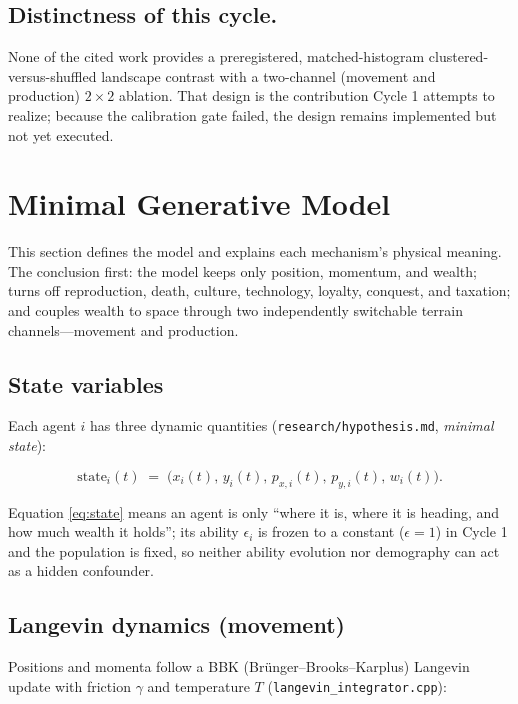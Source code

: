 \documentclass[11pt,a4paper]{article}
\newcommand{\code}[1]{\texttt{#1}}
\begin{document}
\subsection{Distinctness of this cycle.}
None of the cited work provides a preregistered, matched-histogram
clustered-versus-shuffled landscape contrast with a two-channel (movement and
production) $2\times2$ ablation. That design is the contribution Cycle 1
attempts to realize; because the calibration gate failed, the design remains
implemented but not yet executed.

\section{Minimal Generative Model}
\label{sec:model}

This section defines the model and explains each mechanism's physical meaning.
The conclusion first: the model keeps only position, momentum, and wealth;
turns off reproduction, death, culture, technology, loyalty, conquest, and
taxation; and couples wealth to space through two independently switchable
terrain channels---movement and production.

\subsection{State variables}

Each agent $i$ has three dynamic quantities (\code{research/hypothesis.md},
\emph{minimal state}):

\begin{equation}
\text{state}_i(t) \;=\; \bigl(x_i(t),\, y_i(t),\, p_{x,i}(t),\, p_{y,i}(t),\, w_i(t)\bigr).
\label{eq:state}
\end{equation}

Equation \eqref{eq:state} means an agent is only ``where it is, where it is
heading, and how much wealth it holds''; its ability $\epsilon_i$ is frozen to a
constant ($\epsilon=1$) in Cycle 1 and the population is fixed, so neither
ability evolution nor demography can act as a hidden confounder.

\subsection{Langevin dynamics (movement)}

Positions and momenta follow a BBK (Br\"unger--Brooks--Karplus) Langevin update
with friction $\gamma$ and temperature $T$ (\code{langevin\_integrator.cpp}):
\end{document}
